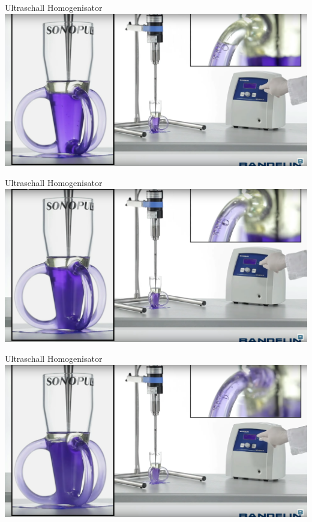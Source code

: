 \documentclass{beamer} %
\begin{document}
\begin{frame}{Ultraschall Homogenisator}
	\centering
	\includegraphics[width=\linewidth]{Markus/uh3}
\end{frame}
\begin{frame}{Ultraschall Homogenisator}
	\centering
	\includegraphics[width=\linewidth]{Markus/uh4}
\end{frame}
\begin{frame}{Ultraschall Homogenisator}
	\centering
	\includegraphics[width=\linewidth]{Markus/uh5}
\end{frame}
\end{document}
